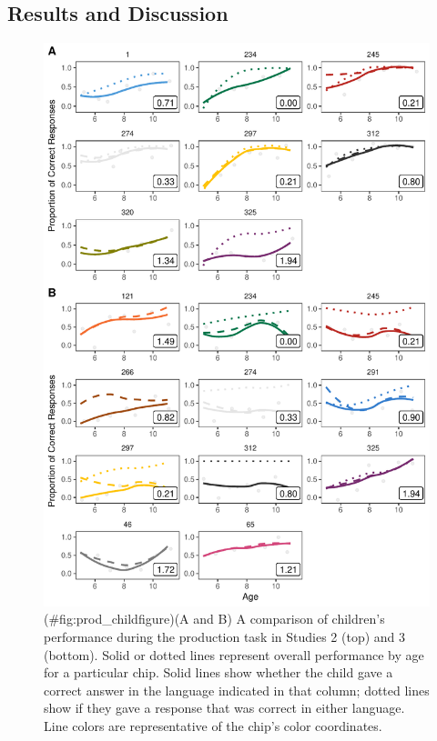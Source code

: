 \documentclass[
  english,
  ,man,floatsintext]{apa6}
\begin{document}
\hypertarget{results-and-discussion-1}{%
\subsection{Results and Discussion}\label{results-and-discussion-1}}

\begin{figure}
\centering
\includegraphics{amazon_color_files/figure-latex/prod_childfigure-1.pdf}
\caption{(\#fig:prod\_childfigure)(A and B) A comparison of children's performance during the production task in Studies 2 (top) and 3 (bottom). Solid or dotted lines represent overall performance by age for a particular chip. Solid lines show whether the child gave a correct answer in the language indicated in that column; dotted lines show if they gave a response that was correct in either language. Line colors are representative of the chip's color coordinates.}
\end{figure}
\end{document}
